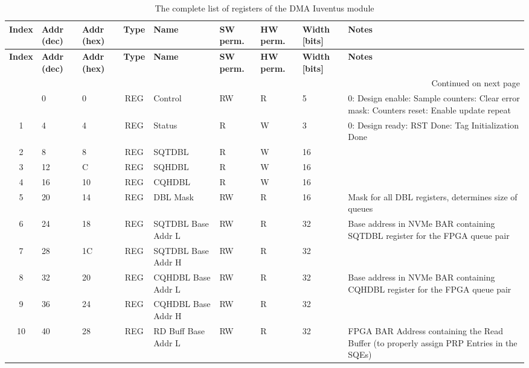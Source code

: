 \begin{landscape}
\begin{longtable}{|c|p{1.1cm}|p{1.1cm}|c|p{5.1cm}|p{1.4cm}|p{1.3cm}|p{1.3cm}|p{6cm}|}
\caption{The complete list of registers of the DMA Iuventus module\label{tab:iuventus_reg_map}}\\
\hline
\textbf{Index} & \textbf{Addr (dec)} & \textbf{Addr (hex)} & \textbf{Type} & \textbf{Name} & \textbf{SW perm.} & \textbf{HW perm.} & \textbf{Width [bits]} & \textbf{Notes} \\ \hline
\endfirsthead
\hline
\textbf{Index} & \textbf{Addr (dec)} & \textbf{Addr (hex)} & \textbf{Type} & \textbf{Name} & \textbf{SW perm.} & \textbf{HW perm.} & \textbf{Width [bits]} & \textbf{Notes} \\ \hline
\endhead
\hline \multicolumn{9}{|r|}{Continued on next page} \\ \hline
\endfoot
\hline
\endlastfoot
0 & 0 & 0 & REG & Control & RW & R & 5 & 0: Design enable\newline 1: Sample counters\newline 2: Clear error mask\newline 3: Counters reset\newline 4: Enable update repeat \\ \hline
1 & 4 & 4 & REG & Status & R & W & 3 & 0: Design ready\newline 1: RST Done\newline 2: Tag Initialization Done \\ \hline
2 & 8 & 8 & REG & SQTDBL & R & W & 16 &  \\ \hline
3 & 12 & C & REG & SQHDBL & R & W & 16 &  \\ \hline
4 & 16 & 10 & REG & CQHDBL & R & W & 16 &  \\ \hline
5 & 20 & 14 & REG & DBL Mask & RW & R & 16 & Mask for all DBL registers, determines size of queues \\ \hline
6 & 24 & 18 & REG & SQTDBL Base Addr L & RW & R & 32 & Base address in NVMe BAR containing SQTDBL register for the FPGA queue pair \\ \hline
7 & 28 & 1C & REG & SQTDBL Base Addr H & RW & R & 32 &  \\ \hline
8 & 32 & 20 & REG & CQHDBL Base Addr L & RW & R & 32 & Base address in NVMe BAR containing CQHDBL register for the FPGA queue pair \\ \hline
9 & 36 & 24 & REG & CQHDBL Base Addr H & RW & R & 32 &  \\ \hline
10 & 40 & 28 & REG & RD Buff Base Addr L & RW & R & 32 & FPGA BAR Address containing the Read Buffer (to properly assign PRP Entries in the SQEs) \\ \hline

\end{longtable}
\end{landscape}
